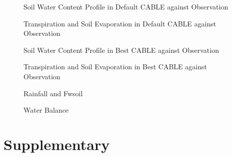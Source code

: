 \documentclass[12pt,a4paper,oneside]{article}
\newcommand{\beginsupplement}{%
        \setcounter{table}{0}
        \renewcommand{\thetable}{S\arabic{table}}%
        \setcounter{figure}{0}
        \renewcommand{\thefigure}{S\arabic{figure}}%
}
\begin{document}


\FloatBarrier

\begin{figure}[!hbtp]
\centering
{}
\caption{\small{Soil Water Content Profile in Default CABLE against Observation}}
\label{}
\end{figure}

\begin{figure}[!hbtp]
\centering
{}
\caption{\small{Transpiration and Soil Evaporation in Default CABLE against Observation}}
\label{}
\end{figure}

\begin{figure}[!hbtp]
\centering
{}
\caption{\small{Soil Water Content Profile in Best CABLE against Observation}}
\label{}
\end{figure}

\begin{figure}[!hbtp]
\centering
{}
\caption{\small{Transpiration and Soil Evaporation in Best CABLE against Observation}}
\label{}
\end{figure}

\begin{figure}[!hbtp]
\centering
{}
\caption{\small{Rainfall and Fwsoil}}
\label{}
\end{figure}

\begin{figure}[!hbtp]
\centering
{}
\caption{\small{Water Balance}}
\label{}
\end{figure}

\FloatBarrier
\newpage
\section*{Supplementary}
\beginsupplement
\end{document}
